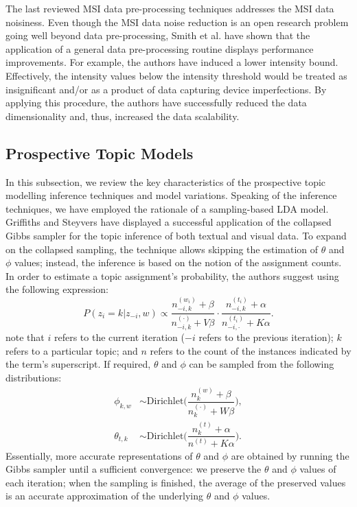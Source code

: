 \documentclass{mpaper}
\begin{document}
\par The last reviewed MSI data pre-processing techniques addresses the MSI data noisiness. Even though the MSI data noise reduction is an open research problem going well beyond data pre-processing, Smith et al. \cite{smith2014proteomics} have shown that the application of a general data pre-processing routine displays performance improvements. For example, the authors have induced a lower intensity bound. Effectively, the intensity values below the intensity threshold would be treated as insignificant and/or as a product of data capturing device imperfections. By applying this procedure, the authors have successfully reduced the data dimensionality and, thus, increased the data scalability.

\subsection{Prospective Topic Models}

\par In this subsection, we review the key characteristics of the prospective topic modelling inference techniques and model variations. Speaking of the inference techniques, we have employed the rationale of a sampling-based LDA model. Griffiths and Steyvers \cite{griffiths2004finding} have displayed a successful application of the collapsed Gibbs sampler for the topic inference of both textual and visual data. To expand on the collapsed sampling, the technique allows skipping the estimation of $\theta$ and $\phi$ values; instead, the inference is based on the notion of the assignment counts. In order to estimate a topic assignment's probability, the authors suggest using the following expression:
\begin{equation*}
P(z_i = k | z_{-i}, w) \propto \dfrac{n_{-i, k}^{(w_i)} + \beta}{n_{-i, k}^{(\cdot)} + V\beta}\cdot \dfrac{n_{-i, k}^{(t_i)} + \alpha}{n_{-i, \cdot}^{(t_i)} + K\alpha}.
\end{equation*}
note that $i$ refers to the current iteration ($-i$ refers to the previous iteration); $k$ refers to a particular topic; and $n$ refers to the count of the instances indicated by the term's superscript. If required, $\theta$ and $\phi$ can be sampled from the following distributions:
\begin{align*}
\phi_{k,w} & \sim \mbox{Dirichlet}\bigg(\dfrac{n_{k}^{(w)} + \beta}{n_{k}^{(\cdot)} + W\beta}\bigg),\\
\theta_{t,k} & \sim \mbox{Dirichlet}\bigg(\dfrac{n_{k}^{(t)} + \alpha}{n^{(t)} + K\alpha}\bigg).
\end{align*}
Essentially, more accurate representations of $\theta$ and $\phi$ are obtained by running the Gibbs sampler until a sufficient convergence: we preserve the $\theta$ and $\phi$ values of each iteration; when the sampling is finished, the average of the preserved values is an accurate approximation of the underlying $\theta$ and $\phi$ values.
\end{document}
